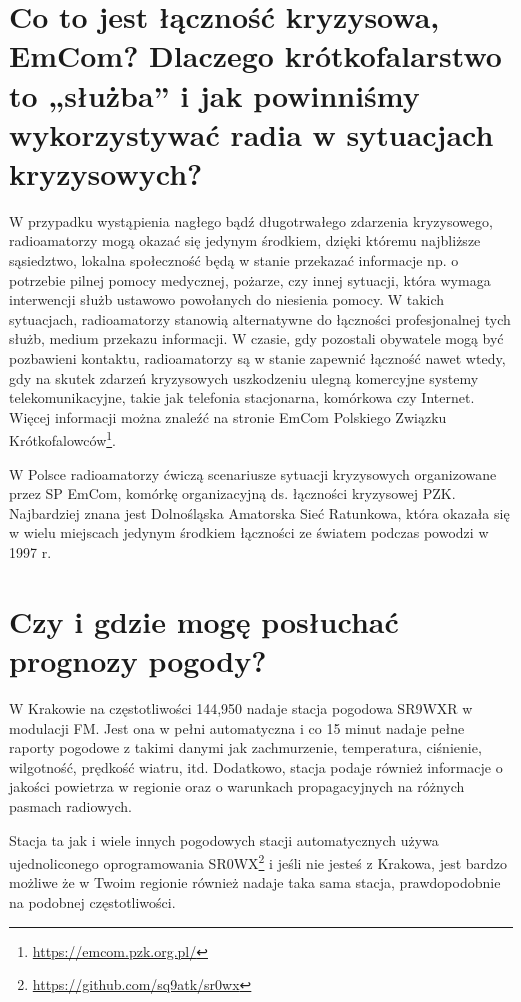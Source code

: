 \documentclass[a4paper,12pt]{article}
\begin{document}
\section{Co to jest łączność kryzysowa, EmCom? Dlaczego krótkofalarstwo to „służba” i jak powinniśmy wykorzystywać radia w sytuacjach kryzysowych?}
W przypadku wystąpienia nagłego bądź długotrwałego zdarzenia kryzysowego, radioamatorzy mogą okazać się jedynym środkiem, dzięki któremu najbliższe sąsiedztwo, lokalna społeczność będą w stanie przekazać informacje np. o potrzebie pilnej pomocy medycznej, pożarze, czy innej sytuacji, która wymaga interwencji służb ustawowo powołanych do niesienia pomocy. W takich sytuacjach, radioamatorzy stanowią alternatywne do łączności profesjonalnej tych służb, medium przekazu informacji. W czasie, gdy pozostali obywatele mogą być pozbawieni kontaktu, radioamatorzy są w stanie zapewnić łączność nawet wtedy, gdy na skutek zdarzeń kryzysowych uszkodzeniu ulegną komercyjne systemy telekomunikacyjne, takie jak telefonia stacjonarna, komórkowa czy Internet. Więcej informacji można znaleźć na stronie EmCom Polskiego Związku Krótkofalowców\footnote{\url{https://emcom.pzk.org.pl/}}.

W Polsce radioamatorzy ćwiczą scenariusze sytuacji kryzysowych organizowane przez SP EmCom, komórkę organizacyjną ds. łączności kryzysowej PZK. Najbardziej znana jest Dolnośląska Amatorska Sieć Ratunkowa, która okazała się w wielu miejscach jedynym środkiem łączności ze światem podczas powodzi w 1997 r.

\section{Czy i gdzie mogę posłuchać prognozy pogody?}
W Krakowie na częstotliwości 144,950 nadaje stacja pogodowa SR9WXR w modulacji FM. Jest ona w pełni automatyczna i co 15 minut nadaje pełne raporty pogodowe z takimi danymi jak zachmurzenie, temperatura, ciśnienie, wilgotność, prędkość wiatru, itd. Dodatkowo, stacja podaje również informacje o jakości powietrza w regionie oraz o warunkach propagacyjnych na różnych pasmach radiowych.

Stacja ta jak i wiele innych pogodowych stacji automatycznych używa ujednoliconego oprogramowania SR0WX\footnote{\url{https://github.com/sq9atk/sr0wx}} i jeśli nie jesteś z Krakowa, jest bardzo możliwe że w Twoim regionie również nadaje taka sama stacja, prawdopodobnie na podobnej częstotliwości.
\end{document}
